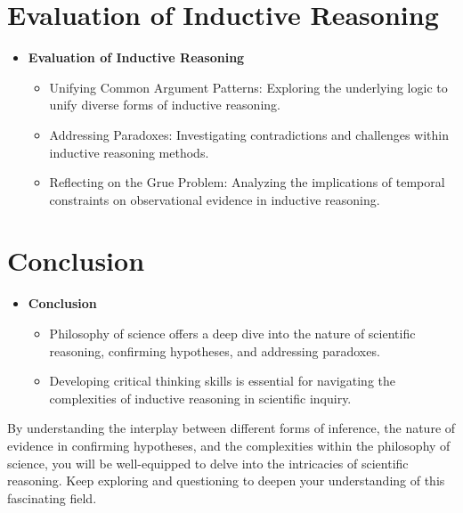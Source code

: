 \documentclass{article}
\begin{document}
\section{Evaluation of Inductive Reasoning}
\begin{itemize}
  \item \textbf{Evaluation of Inductive Reasoning}
    \begin{itemize}
      \item Unifying Common Argument Patterns: Exploring the underlying logic to unify diverse forms of inductive reasoning.
      \item Addressing Paradoxes: Investigating contradictions and challenges within inductive reasoning methods.
      \item Reflecting on the Grue Problem: Analyzing the implications of temporal constraints on observational evidence in inductive reasoning.
    \end{itemize}
\end{itemize}

\section{Conclusion}
\begin{itemize}
  \item \textbf{Conclusion}
    \begin{itemize}
      \item Philosophy of science offers a deep dive into the nature of scientific reasoning, confirming hypotheses, and addressing paradoxes.
      \item Developing critical thinking skills is essential for navigating the complexities of inductive reasoning in scientific inquiry.
    \end{itemize}
\end{itemize}

By understanding the interplay between different forms of inference, the nature of evidence in confirming hypotheses, and the complexities within the philosophy of science, you will be well-equipped to delve into the intricacies of scientific reasoning. Keep exploring and questioning to deepen your understanding of this fascinating field.
\end{document}
